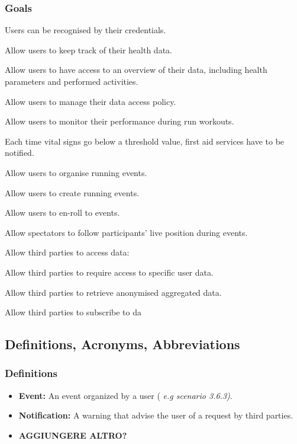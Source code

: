 \documentclass{article}
\begin{document}
\subsubsection{Goals} \label{goals}
\begin{enumerate}[label={\textbf{[G\arabic*]}}]
\item Users can be recognised by their credentials.
\item Allow users to keep track of their health data.
\item Allow users to have access to an overview of their data, including health parameters and performed activities. \label{g3}
\item Allow users to manage their data access policy.
\item Allow users to monitor their performance during run workouts.
\item Each time vital signs go below a threshold value, first aid services have to be notified.
\item Allow users to organise running events.
		\begin{enumerate}[label={[G\arabic{enumi}.\arabic*]}]
    		\item Allow users to create running events.
    		\item Allow users to en-roll to events.
    		\item Allow spectators to follow participants’ live position during events.
  		\end{enumerate}
\item Allow third parties to access data:
		\begin{enumerate}[label={[G\arabic{enumi}.\arabic*]}]
    		\item Allow third parties to require access to specific user data.
    		\item Allow third parties to retrieve anonymised aggregated data.
    		\item Allow third parties to subscribe to da
  		\end{enumerate}

\end{enumerate}

\subsection{Definitions, Acronyms, Abbreviations}

\subsubsection{Definitions}
\begin{itemize}
	\item \textbf{Event:} An event organized by a user (\textit{ e.g scenario 3.6.3)}.
	\item \textbf{Notification:} A warning that advise the user of a request by third parties.
	\item \textbf{AGGIUNGERE ALTRO?} 
	\end{itemize}
\end{document}
